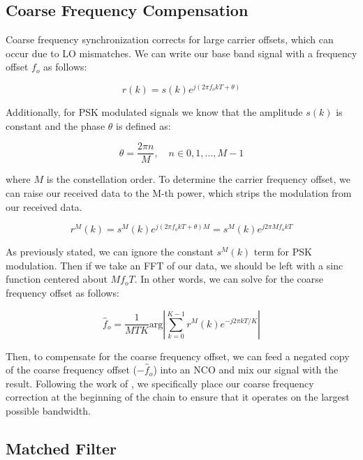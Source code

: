 \documentclass[conference,onecolumn]{IEEEtran}
\begin{document}
\subsection{Coarse Frequency Compensation}

Coarse frequency synchronization corrects for large carrier offsets, which can occur due to LO mismatches. We can write our base band signal with a frequency offset $f_o$ as follows:

\begin{equation}
	r(k) = s(k)e^{j(2{\pi}f_okT + \theta)}
\end{equation}

\noindent Additionally, for PSK modulated signals we know that the amplitude $s(k)$ is constant and the phase $\theta$ is defined as:

\begin{equation}
	\theta = \frac{2{\pi}n}{M},\quad n \in 0,1,...,M-1
\end{equation}

\noindent where $M$ is the constellation order. To determine the carrier frequency offset, we can raise our received data to the M-th power, which strips the modulation from our received data.

\begin{equation}
	r^M(k) = s^M(k)e^{j(2{\pi}f_okT + \theta)M} = s^M(k)e^{j2{\pi}Mf_okT}
\end{equation}

\noindent As previously stated, we can ignore the constant $s^M(k)$ term for PSK modulation. Then if we take an FFT of our data, we should be left with a sinc function centered about $Mf_oT$. In other words, we can solve for the coarse frequency offset as follows:

\begin{equation}
	\hat{f}_o = \frac{1}{MTK}\text{arg}\left|\sum_{k=0}^{K-1}{r^M(k)e^{-j2{\pi}kT/K}}\right|
	\label{eq::cfo_estimate}
\end{equation}

\noindent Then, to compensate for the coarse frequency offset, we can feed a negated copy of the coarse frequency offset ($-\hat{f}_o$) into an NCO and mix our signal with the result. Following the work of \cite{collins_2018_softwaredefined}, we specifically place our coarse frequency correction at the beginning of the chain to ensure that it operates on the largest possible bandwidth.
 
\subsection{Matched Filter}
\end{document}
